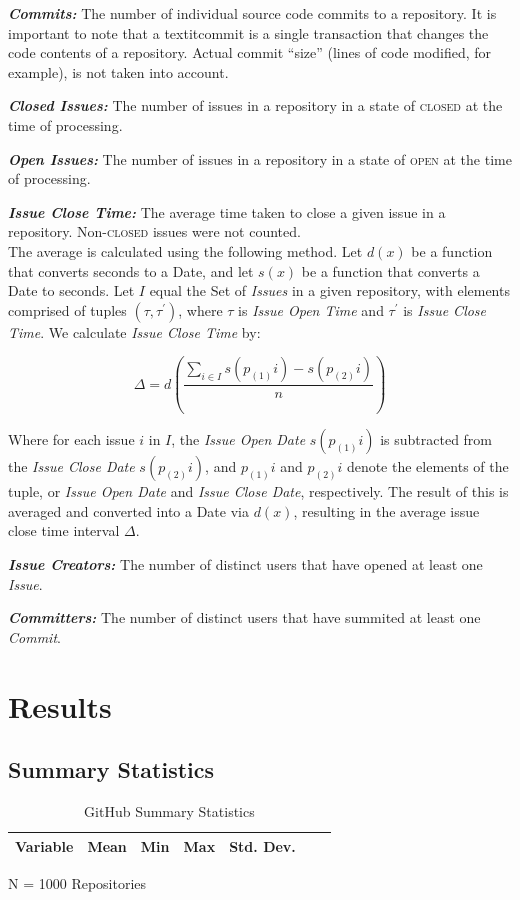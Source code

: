 \documentclass{proc}
\begin{document}
{{{{{{{\noindent \textbf{\textit{Commits:}}
The number of individual source code commits to a repository. It is important to note that a textit{commit} is a single transaction that changes the code contents of a repository. Actual commit ``size'' (lines of code modified, for example), is not taken into account.

\noindent \textbf{\textit{Closed Issues:}}
The number of issues in a repository in a state of \textsc{closed} at the time of processing.

\noindent \textbf{\textit{Open Issues:}}
The number of issues in a repository in a state of \textsc{open} at the time of processing.

\noindent \textbf{\textit{Issue Close Time:}}
The average time taken to close a given issue in a repository. Non-\textsc{closed} issues were not counted.\\

The average is calculated using the following method. Let $d(x)$ be a function that converts seconds to a Date, and let $s(x)$ be a function that converts a Date to seconds. Let $I$ equal the Set of \textit{Issues} in a given repository, with elements comprised of tuples $(\tau, \tau^\prime)$, where $\tau$ is \textit{Issue Open Time} and $\tau^\prime$ is \textit{Issue Close Time}. We calculate \textit{Issue Close Time} by: 

\[ \Delta = d\left( \frac{\sum_{i \in I} s( p_{(1)}i ) - s( p_{(2)}i )  } {n} \right) \]

Where for each issue $i$ in $I$, the \textit{Issue Open Date} $s( p_{(1)}i)$ is subtracted from the \textit{Issue Close Date} $s( p_{(2)}i)$, and $p_{(1)}i$ and $p_{(2)}i$ denote the elements of the tuple, or \textit{Issue Open Date} and \textit{Issue Close Date}, respectively. The result of this is averaged and converted into a Date via $d(x)$, resulting in the average issue close time interval $\Delta$.

\noindent \textbf{\textit{Issue Creators:}}
The number of distinct users that have opened at least one \textit{Issue}.

\noindent \textbf{\textit{Committers:}}
The number of distinct users that have summited at least one \textit{Commit}.

\section{Results}

\subsection{Summary Statistics}
\begin{table}[!ht]
\begin{center}
\begin{tabular}{rrrrrrr}
\hline
Variable & Mean & Min & Max & Std. Dev. \\
\hline

\hline
\end{tabular}
N = 1000 Repositories
\caption{GitHub Summary Statistics}
\label{table:summary_stats}
\end{center}
\end{table}

}}}}}}}
\end{document}
